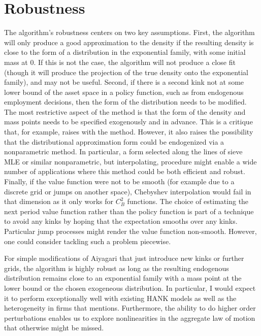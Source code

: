 \documentclass[11pt]{article}
\begin{document}
\section{Robustness} 
The algorithm's robustness centers on two key assumptions. First, the algorithm will only produce a good approximation to the density if the resulting density is close to the form of a distribution in the exponential family, with some initial mass at 0. If this is not the case, the algorithm will not produce a close fit (though it will produce the projection of the true density onto the exponential family), and may not be useful. Second, if there is a second kink not at some lower bound of the asset space in a policy function, such as from endogenous employment decisions, then the form of the distribution needs to be modified. The most restrictive aspect of the method is that the form of the density and mass points needs to be specified exogenously and in advance. This is a critique that, for example, \cite{Bayer2020} raises with the method. However, it also raises the possibility that the distributional approximation form could be endogenized via a nonparametric method. In particular, a form selected along the lines of sieve MLE or similar nonparametric, but interpolating, procedure might enable a wide number of applications where this method could be both efficient and robust. Finally, if the value function were not to be smooth (for example due to a discrete grid or jumps on another space), Chebyshev interpolation would fail in that dimension as it only works for $C^2_{B}$  functions. The choice of estimating the next period value function rather than the policy function is part of a technique to avoid any kinks by hoping that the expectation smooths over any kinks. Particular jump processes might render the value function non-smooth. However, one could consider tackling such a problem piecewise.
\par For simple modifications of Aiyagari that just introduce new kinks or further grids, the algorithm is highly robust as long as the resulting endogenous distribution remains close to an exponential family with a mass point at the lower bound or the chosen exogeneous distribution. In particular, I would expect it to perform exceptionally well with existing HANK models as well as the heterogeneity in firms that \cite{Winberry2021} mentions. Furthermore, the ability to do higher order perturbations enables us to explore nonlinearities in the aggregate law of motion that otherwise might be missed. 
\end{document}
